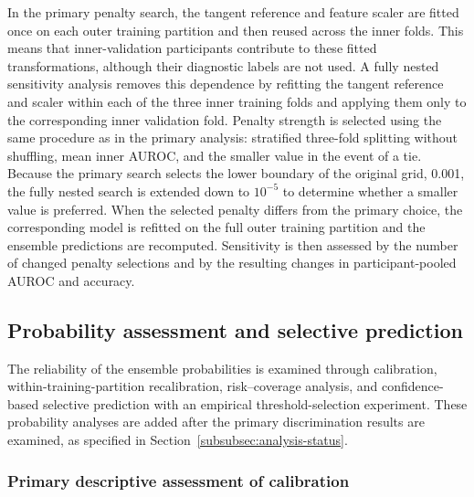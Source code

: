 In the primary penalty search, the tangent reference and feature scaler are fitted once on each outer training partition and then reused across the inner folds. This means that inner-validation participants contribute to these fitted transformations, although their diagnostic labels are not used. A fully nested sensitivity analysis removes this dependence by refitting the tangent reference and scaler within each of the three inner training folds and applying them only to the corresponding inner validation fold. Penalty strength is selected using the same procedure as in the primary analysis: stratified three-fold splitting without shuffling, mean inner AUROC, and the smaller value in the event of a tie. Because the primary search selects the lower boundary of the original grid, 0.001, the fully nested search is extended down to $10^{-5}$ to determine whether a smaller value is preferred. When the selected penalty differs from the primary choice, the corresponding model is refitted on the full outer training partition and the ensemble predictions are recomputed. Sensitivity is then assessed by the number of changed penalty selections and by the resulting changes in participant-pooled AUROC and accuracy.

\subsection{Probability assessment and selective prediction}
\label{subsec:probability-assessment}
The reliability of the ensemble probabilities is examined through calibration, within-training-partition recalibration, risk--coverage analysis, and confidence-based selective prediction with an empirical threshold-selection experiment. These probability analyses are added after the primary discrimination results are examined, as specified in Section~\ref{subsubsec:analysis-status}.

\subsubsection{Primary descriptive assessment of calibration}
\label{subsubsec:calibration-assessment}

